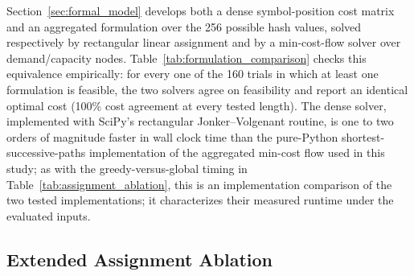 \documentclass[preprint,12pt]{elsarticle}
\theoremstyle{plain}
\providecommand{\DIFaddtex}[1]{{\protect\color{blue} \sf #1}} %
\providecommand{\DIFdeltex}[1]{{\protect\color{red} \scriptsize #1}} %
\providecommand{\DIFaddbegin}{} %
\providecommand{\DIFaddend}{} %
\providecommand{\DIFdelbegin}{} %
\providecommand{\DIFdelend}{} %
\providecommand{\DIFadd}[1]{\texorpdfstring{\DIFaddtex{#1}}{#1}} %
\providecommand{\DIFdel}[1]{\texorpdfstring{\DIFdeltex{#1}}{}} %
\providecommand{\DIFscaledelfig}{0.5}
\newlength{\DIFdelgraphicswidth} %
\newlength{\DIFdelgraphicsheight} %
\providecommand{\DIFaddincludegraphics}[2][]{{\color{blue}\fbox{\DIFOincludegraphics[#1]{#2}}}} %
\providecommand{\DIFdelincludegraphics}[2][]{%
\sbox{\DIFdelgraphicsbox}{\DIFOincludegraphics[#1]{#2}}%
\settoboxwidth{\DIFdelgraphicswidth}{\DIFdelgraphicsbox} %
\settoboxtotalheight{\DIFdelgraphicsheight}{\DIFdelgraphicsbox} %
\scalebox{\DIFscaledelfig}{%
\parbox[b]{\DIFdelgraphicswidth}{\usebox{\DIFdelgraphicsbox}\\[-\baselineskip] \rule{\DIFdelgraphicswidth}{0em}}\llap{\resizebox{\DIFdelgraphicswidth}{\DIFdelgraphicsheight}{%
\setlength{\unitlength}{\DIFdelgraphicswidth}%
\begin{picture}(1,1)%
\thicklines\linethickness{2pt} %
{\color[rgb]{1,0,0}\put(0,0){\framebox(1,1){}}}%
{\color[rgb]{1,0,0}\put(0,0){\line( 1,1){1}}}%
{\color[rgb]{1,0,0}\put(0,1){\line(1,-1){1}}}%
\end{picture}%
}\hspace*{3pt}}} %
} %
\DeclareRobustCommand{\DIFaddbegin}{\DIFOaddbegin \let\includegraphics\DIFaddincludegraphics} %
\DeclareRobustCommand{\DIFaddend}{\DIFOaddend \let\includegraphics\DIFOincludegraphics} %
\DeclareRobustCommand{\DIFdelbegin}{\DIFOdelbegin \let\includegraphics\DIFdelincludegraphics} %
\DeclareRobustCommand{\DIFdelend}{\DIFOaddend \let\includegraphics\DIFOincludegraphics} %
\renewcommand{\DIFdel}[1]{}
\renewcommand{\DIFdelincludegraphics}[2][]{}
\begin{document}
Section~\ref{sec:formal_model} develops both a dense symbol-position cost
matrix and an aggregated formulation over the 256 possible hash values,
solved respectively by rectangular linear assignment and by a min-cost-flow
solver over demand/capacity nodes. Table~\ref{tab:formulation_comparison}
checks this equivalence empirically: for every one of the 160 trials in which
at least one formulation is feasible, the two solvers agree on feasibility
and report an identical optimal cost (100\% cost agreement at every tested
length). The dense solver, implemented with SciPy's rectangular
Jonker--Volgenant routine, is one to two orders of magnitude faster in wall
clock time than the pure-Python shortest-successive-paths implementation of
the aggregated min-cost flow used in this study; as with the greedy-versus-global
timing in Table~\ref{tab:assignment_ablation}, this is an implementation
\DIFdelbegin \DIFdel{result for the two solvers compared here and not an asymptotic claim about
the two formulations in general}\DIFdelend \DIFaddbegin \DIFadd{comparison of the two tested implementations; it characterizes their measured
runtime under the evaluated inputs}\DIFaddend .

\begin{table}[!t]
\centering
\caption{Dense Versus Aggregated Flow: Cost Agreement and Running Time}
\label{tab:formulation_comparison}

\end{table}

\subsection{Extended Assignment Ablation}
\end{document}
